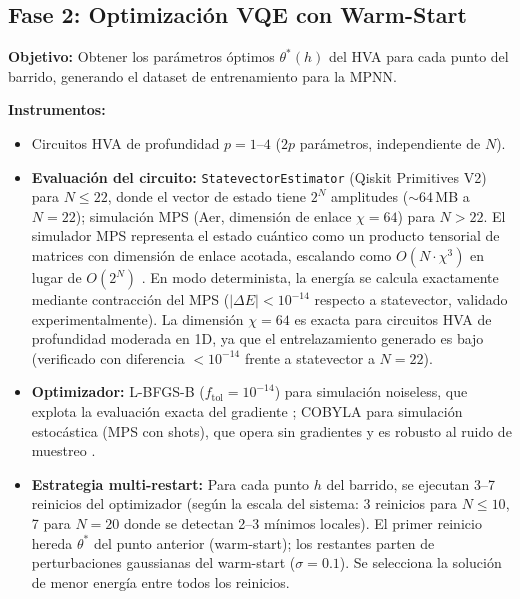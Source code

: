 \documentclass[11pt,a4paper,spanish]{book}
\begin{document}
\subsection{Fase 2: Optimización VQE con Warm-Start}

\textbf{Objetivo:} Obtener los parámetros óptimos $\theta^*(h)$ del HVA para cada punto del barrido, generando el dataset de entrenamiento para la MPNN.

\textbf{Instrumentos:}
\begin{itemize}
    \item Circuitos HVA de profundidad $p = 1$--$4$ ($2p$ parámetros, independiente de $N$).

    \item \textbf{Evaluación del circuito:} \texttt{StatevectorEstimator} (Qiskit Primitives V2) para $N \leq 22$, donde el vector de estado tiene $2^N$ amplitudes ($\sim 64$\,MB a $N = 22$); simulación MPS (Aer, dimensión de enlace $\chi = 64$) para $N > 22$. El simulador MPS representa el estado cuántico como un producto tensorial de matrices con dimensión de enlace acotada, escalando como $O(N \cdot \chi^3)$ en lugar de $O(2^N)$ \citep{hauschild2018}. En modo determinista, la energía se calcula exactamente mediante contracción del MPS ($|\Delta E| < 10^{-14}$ respecto a statevector, validado experimentalmente). La dimensión $\chi = 64$ es exacta para circuitos HVA de profundidad moderada en 1D, ya que el entrelazamiento generado es bajo (verificado con diferencia $< 10^{-14}$ frente a statevector a $N = 22$).

    \item \textbf{Optimizador:} L-BFGS-B ($f_{\text{tol}} = 10^{-14}$) para simulación noiseless, que explota la evaluación exacta del gradiente \citep{tilly2022}; COBYLA para simulación estocástica (MPS con shots), que opera sin gradientes y es robusto al ruido de muestreo \citep{singh2025}.

    \item \textbf{Estrategia multi-restart:} Para cada punto $h$ del barrido, se ejecutan 3--7 reinicios del optimizador (según la escala del sistema: 3 reinicios para $N \leq 10$, 7 para $N = 20$ donde se detectan 2--3 mínimos locales). El primer reinicio hereda $\theta^*$ del punto anterior (warm-start); los restantes parten de perturbaciones gaussianas del warm-start ($\sigma = 0.1$). Se selecciona la solución de menor energía entre todos los reinicios.
\end{itemize}
\end{document}
